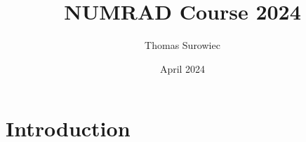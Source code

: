 \documentclass{article}
\title{NUMRAD Course 2024}
\author{Thomas Surowiec}
\date{April 2024}
\begin{document}
\maketitle

\section{Introduction}
\end{document}
